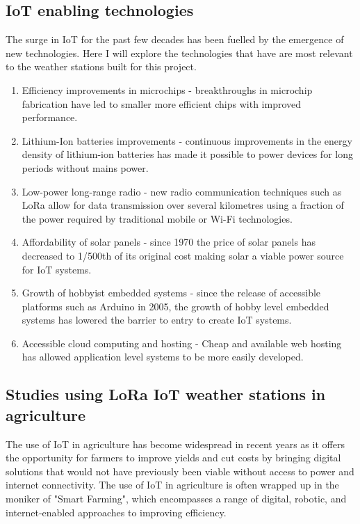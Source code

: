 \subsection{IoT enabling technologies}

The surge in IoT for the past few decades has been fuelled by the emergence of
new technologies. Here I will explore the technologies that have are most
relevant to the weather stations built for this project.

\begin{enumerate}
  \item Efficiency improvements in microchips - breakthroughs in microchip
  fabrication have led to smaller more efficient chips with improved
  performance.
  \item Lithium-Ion batteries improvements - continuous improvements in the
  energy density of lithium-ion batteries has made it possible to power devices
  for long periods without mains power.
  \item Low-power long-range radio - new radio communication techniques such as
  LoRa allow for data transmission over several kilometres using a fraction of
  the power required by traditional mobile or Wi-Fi technologies.
  \item Affordability of solar panels - since 1970 the price of solar panels has
  decreased to 1/500th of its original cost \cite{economist2024} making solar a
  viable power source for IoT systems.
  \item Growth of hobbyist embedded systems - since the release of accessible
  platforms such as Arduino in 2005, the growth of hobby level embedded systems
  has lowered the barrier to entry to create IoT systems.
  \item Accessible cloud computing and hosting - Cheap and available web hosting
  has allowed application level systems to be more easily developed.
\end{enumerate}

\subsection{Studies using LoRa IoT weather stations in agriculture}

The use of IoT in agriculture has become widespread in recent years as it offers
the opportunity for farmers to improve yields and cut costs by bringing digital
solutions that would not have previously been viable without access to power and
internet connectivity. The use of IoT in agriculture is often wrapped up in the
moniker of "Smart Farming", which encompasses a range of digital, robotic, and
internet-enabled approaches to improving efficiency.

